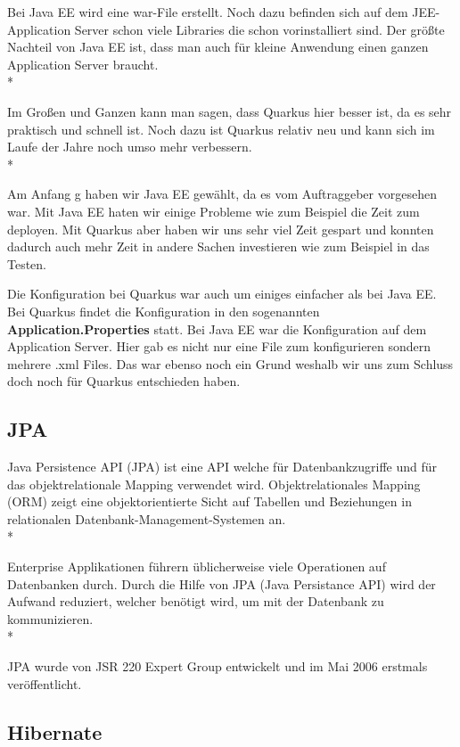 Bei Java EE wird eine war-File erstellt. Noch dazu befinden sich auf dem JEE-Application Server schon viele Libraries die schon vorinstalliert sind. 
Der größte Nachteil von Java EE ist, dass man auch für kleine Anwendung einen ganzen Application Server braucht. \\*

Im Großen und Ganzen kann man sagen, dass Quarkus hier besser ist, da es sehr praktisch und schnell ist. 
Noch dazu ist Quarkus relativ neu und kann sich im Laufe der Jahre noch umso mehr verbessern. \\*

Am Anfang g haben wir Java EE gewählt, da es vom Auftraggeber vorgesehen war. Mit Java EE haten wir einige Probleme wie zum Beispiel die Zeit zum deployen. 
Mit Quarkus aber haben wir uns sehr viel Zeit gespart und konnten dadurch auch mehr Zeit in andere Sachen investieren wie zum Beispiel in das Testen.

Die Konfiguration bei Quarkus war auch um einiges einfacher als bei Java EE. Bei Quarkus findet die Konfiguration in den sogenannten \textbf{Application.Properties} statt.
Bei Java EE war die Konfiguration auf dem Application Server. Hier gab es nicht nur eine File zum konfigurieren sondern mehrere .xml Files. 
Das war ebenso noch ein Grund weshalb wir uns zum Schluss doch noch für Quarkus entschieden haben.


\subsection{JPA}
\author{David Ignjatovic} 

Java Persistence API (JPA) ist eine API welche für Datenbankzugriffe und für das objektrelationale Mapping verwendet wird. 
Objektrelationales Mapping (ORM) zeigt eine objektorientierte Sicht auf Tabellen und Beziehungen in relationalen Datenbank-Management-Systemen an.  \\*

Enterprise Applikationen führern üblicherweise viele Operationen auf Datenbanken durch.
Durch die Hilfe von JPA (Java Persistance API) wird der Aufwand reduziert, welcher benötigt wird, um mit der Datenbank zu kommunizieren. \\* \cite{JPA}

JPA wurde von JSR 220 Expert Group entwickelt und im Mai 2006 erstmals veröffentlicht.


\subsection{Hibernate}
\author{David Ignjatovic}

